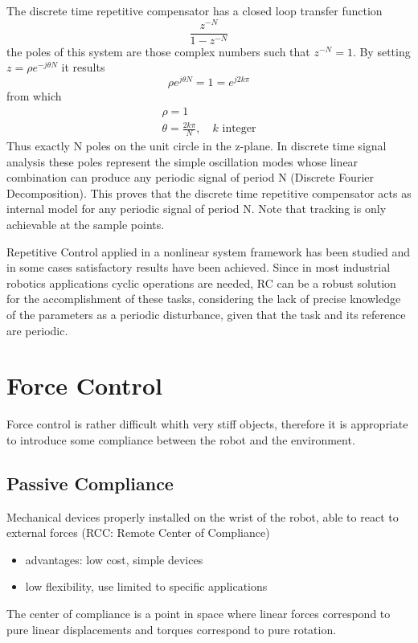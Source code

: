 \documentclass{book}
\begin{document}
The discrete time repetitive compensator has a closed loop transfer function 
\[
    \displaystyle\frac{z^{-N}}{1-z^{-N}}
\]
the poles of this system are those complex numbers such that $z^{-N}=1$. By setting $z=\rho e^{-j\theta N}$ it results 
\[
    \rho e^{j\theta N} = 1 = e^{j2k\pi}
\]
from which 
\begin{align*}
    \rho = 1 \\
    \theta = \displaystyle\frac{2k\pi}{N}, \quad k \text{ integer}
\end{align*}
Thus exactly N poles on the unit circle in the z-plane. In discrete time signal analysis these poles represent the simple oscillation modes whose linear combination can produce any periodic signal of period N (Discrete Fourier Decomposition). This proves that the discrete time repetitive compensator acts as internal model for any periodic signal of period N. 
Note that tracking is only achievable at the sample points. 

Repetitive Control applied in a nonlinear system framework has been studied and in some cases satisfactory results have been achieved. Since in most industrial robotics applications cyclic operations are needed, RC can be a robust solution for the accomplishment of these tasks, considering the lack of precise knowledge of the parameters as a periodic disturbance, given that the task and its reference are periodic. 


\chapter{Force Control}
Force control is rather difficult whith very stiff objects, therefore it is appropriate to introduce some compliance between the robot and the environment. 
\section{Passive Compliance}
Mechanical devices properly installed on the wrist of the robot, able to react to external forces (RCC: Remote Center of Compliance)
\begin{itemize}
    \item advantages: low cost, simple devices
    \item low flexibility, use limited to specific applications
\end{itemize}
The center of compliance is a point in space where linear forces correspond to pure linear displacements and torques correspond to pure rotation.
\end{document}
